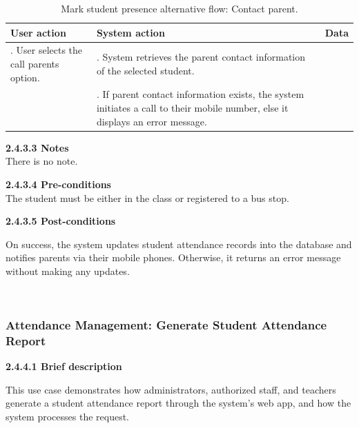 \begin{longtable}{|>{\raggedright\arraybackslash}p{4.5cm}|
                  >{\raggedright\arraybackslash}p{6cm}|
                  >{\raggedright\arraybackslash}p{4.5cm}|}                  
\caption{Mark student presence alternative flow: Contact parent.}
\label{tab:student_attendance_contact_parent_alternative_flow} \\
\hline
\centering\textbf{User action} & \centering\textbf{System action} & \centering\arraybackslash\textbf{Data} \\
\hline
\endfirsthead
\endhead
1. User selects the call parents option.& 2. System retrieves the parent contact information of the selected student.&\\
\hline
&3. If parent contact information exists, the system initiates a call to their mobile number, else it displays an error message.&\\
\hline
\end{longtable}

\indent\textbf{2.4.3.3 Notes}\\
\indent\indent There is no note.
\vspace{0.5em}

\indent\textbf{2.4.3.4 Pre-conditions}\\
\indent\indent The student must be either in the class or registered to a bus stop.

\vspace{0.5em}
\indent\textbf{2.4.3.5 Post-conditions}\\
\vspace{-0.7em}
\par\indent\indent\parbox{0.87\textwidth}{
    On success, the system updates student attendance records into the database and notifies parents via their mobile phones. Otherwise, it returns an error message without making any updates.
}\\

\subsubsection{Attendance Management: Generate Student Attendance Report}
\indent\indent\textbf{2.4.4.1 Brief description}
\vspace{0.5em}
\par\indent\indent\parbox{0.9\textwidth}{
    This use case demonstrates how administrators, authorized staff, and teachers generate a student attendance report through the system's web app, and how the system processes the request.
}\\


